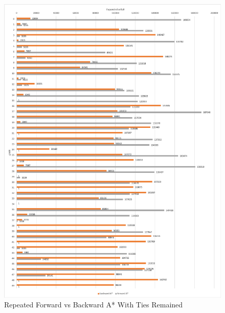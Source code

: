 \documentclass{article}
\begin{document}
\begin{figure}
\centering
\includegraphics[scale=0.47]{part3.2}
\caption{Repeated Forward vs Backward A* With Ties Remained}
\label{part3.2}
\end{figure}
\end{document}
